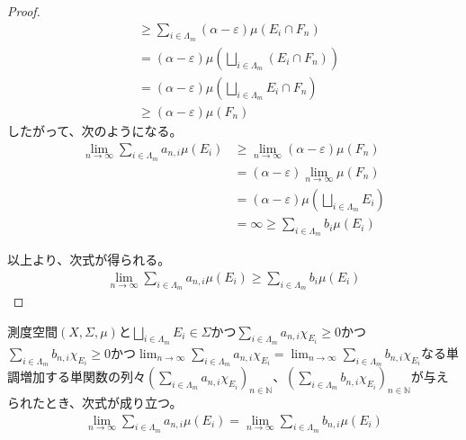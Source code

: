 \documentclass[dvipdfmx]{jsarticle}
\begin{document}
\begin{proof}
\begin{align*}
&\geq \sum_{i \in \varLambda_{m}} {(\alpha - \varepsilon)\mu\left( E_{i} \cap F_{n} \right)}\\
&= (\alpha - \varepsilon)\mu\left( \bigsqcup_{i \in \varLambda_{m}} \left( E_{i} \cap F_{n} \right) \right)\\
&= (\alpha - \varepsilon)\mu\left( \bigsqcup_{i \in \varLambda_{m}} E_{i} \cap F_{n} \right)\\
&\geq (\alpha - \varepsilon)\mu\left( F_{n} \right)
\end{align*}
したがって、次のようになる。
\begin{align*}
\lim_{n \rightarrow \infty}{\sum_{i \in \varLambda_{m}} {a_{n,i}\mu\left( E_{i} \right)}} &\geq \lim_{n \rightarrow \infty}{(\alpha - \varepsilon)\mu\left( F_{n} \right)}\\
&= (\alpha - \varepsilon)\lim_{n \rightarrow \infty}{\mu\left( F_{n} \right)}\\
&= (\alpha - \varepsilon)\mu\left( \bigsqcup_{i \in \varLambda_{m}} E_{i} \right)\\
&= \infty \geq \sum_{i \in \varLambda_{m}} {b_{i}\mu\left( E_{i} \right)}
\end{align*}\par
以上より、次式が得られる。
\begin{align*}
\lim_{n \rightarrow \infty}{\sum_{i \in \varLambda_{m}} {a_{n,i}\mu\left( E_{i} \right)}} \geq \sum_{i \in \varLambda_{m}} {b_{i}\mu\left( E_{i} \right)}
\end{align*}
\end{proof}
\begin{thm}\label{4.6.1.5}
測度空間$(X,\varSigma,\mu)$と$\bigsqcup_{i \in \varLambda_{m}} E_{i} \in \varSigma$かつ$\sum_{i \in \varLambda_{m}} {a_{n,i}\chi_{E_{i}}} \geq 0$かつ$\sum_{i \in \varLambda_{m}} {b_{n,i}\chi_{E_{i}}} \geq 0$かつ$\lim_{n \rightarrow \infty}{\sum_{i \in \varLambda_{m}} {a_{n,i}\chi_{E_{i}}}} = \lim_{n \rightarrow \infty}{\sum_{i \in \varLambda_{m}} {b_{n,i}\chi_{E_{i}}}}$なる単調増加する単関数の列々$\left( \sum_{i \in \varLambda_{m}} {a_{n,i}\chi_{E_{i}}} \right)_{n \in \mathbb{N}}$、$\left( \sum_{i \in \varLambda_{m}} {b_{n,i}\chi_{E_{i}}} \right)_{n \in \mathbb{N}}$が与えられたとき、次式が成り立つ。
\begin{align*}
\lim_{n \rightarrow \infty}{\sum_{i \in \varLambda_{m}} {a_{n,i}\mu\left( E_{i} \right)}} = \lim_{n \rightarrow \infty}{\sum_{i \in \varLambda_{m}} {b_{n,i}\mu\left( E_{i} \right)}}
\end{align*}
\end{thm}
\end{document}
